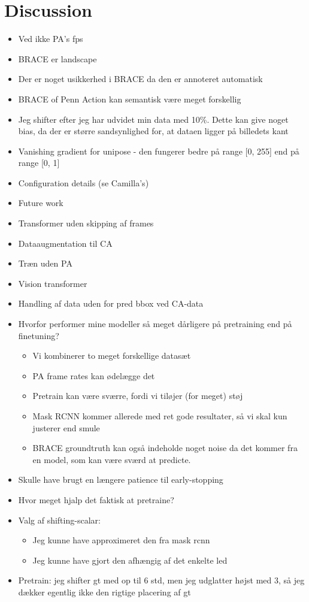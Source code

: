 \documentclass[./main.tex]{subfiles}
\begin{document}
\section{Discussion}
\begin{itemize}
    \item Ved ikke PA's fps
    \item BRACE er landscape
    \item Der er noget usikkerhed i BRACE da den er annoteret automatisk
    \item BRACE of Penn Action kan semantisk være meget forskellig
    \item Jeg shifter efter jeg har udvidet min data med 10\%. Dette kan give noget bias, da der er større sandsynlighed for, at dataen ligger på billedets kant
    \item Vanishing gradient for unipose - den fungerer bedre på range [0, 255] end på range [0, 1]
    \item Configuration details (se Camilla's)
    \item Future work
        \item Transformer uden skipping af frames 
        \item Dataaugmentation til CA
        \item Træn uden PA
        \item Vision transformer
    \item Handling af data uden for pred bbox ved CA-data
    \item Hvorfor performer mine modeller så meget dårligere på pretraining end på finetuning?
    \begin{itemize}
        \item Vi kombinerer to meget forskellige datasæt
        \item PA frame rates kan ødelægge det
        \item Pretrain kan være sværre, fordi vi tiløjer (for meget) støj
        \item Mask RCNN kommer allerede med ret gode resultater, så vi skal kun justerer end smule
        \item BRACE groundtruth kan også indeholde noget noise da det kommer fra en model, som kan være sværd at predicte.
    \end{itemize}
    \item Skulle have brugt en længere patience til early-stopping
    \item Hvor meget hjalp det faktisk at pretraine?
    \item Valg af shifting-scalar:
    \begin{itemize}
        \item Jeg kunne have approximeret den fra mask rcnn
        \item Jeg kunne have gjort den afhængig af det enkelte led
    \end{itemize}
    \item Pretrain: jeg shifter gt med op til 6 std, men jeg udglatter højst med 3, så jeg dækker egentlig ikke den rigtige placering af gt
\end{itemize}
\end{document}
